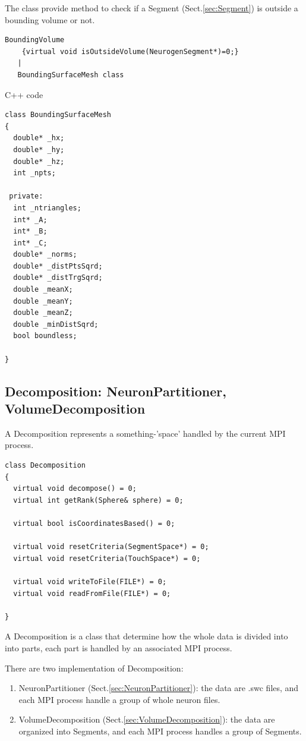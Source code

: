 The class provide method to check if a Segment (Sect.\ref{sec:Segment}) is
outside a bounding volume or not.

\begin{verbatim}
BoundingVolume
    {virtual void isOutsideVolume(NeurogenSegment*)=0;}
   |
   BoundingSurfaceMesh class
\end{verbatim}

C++ code
\begin{verbatim}
class BoundingSurfaceMesh
{
  double* _hx;
  double* _hy;
  double* _hz;
  int _npts;

 private:
  int _ntriangles;
  int* _A;
  int* _B;
  int* _C;
  double* _norms;
  double* _distPtsSqrd;
  double* _distTrgSqrd;
  double _meanX;
  double _meanY;
  double _meanZ;
  double _minDistSqrd;
  bool boundless;

}
\end{verbatim}

\subsection{Decomposition: NeuronPartitioner, VolumeDecomposition}
\label{sec:Decomposition}

A Decomposition represents a something-'space' handled by the current MPI
process.

\begin{lstlisting}
class Decomposition
{
  virtual void decompose() = 0;
  virtual int getRank(Sphere& sphere) = 0;

  virtual bool isCoordinatesBased() = 0;

  virtual void resetCriteria(SegmentSpace*) = 0;
  virtual void resetCriteria(TouchSpace*) = 0;

  virtual void writeToFile(FILE*) = 0;
  virtual void readFromFile(FILE*) = 0;

}
\end{lstlisting}


A Decomposition is a class that determine how the whole data is divided into
into parts, each part is handled by an associated MPI process.

There are two implementation of Decomposition:
\begin{enumerate}
  \item NeuronPartitioner (Sect.\ref{sec:NeuronPartitioner}): the data are .swc
  files, and each MPI process handle a group of whole neuron files.
  
  \item VolumeDecomposition (Sect.\ref{sec:VolumeDecomposition}): the data are
  organized into Segments, and each MPI process handles a group of Segments.
  
\end{enumerate}

